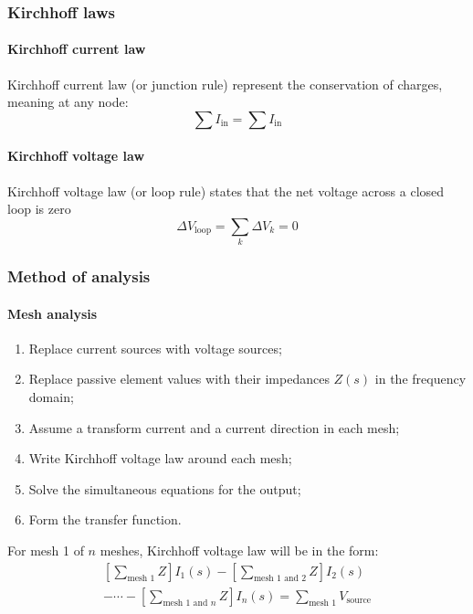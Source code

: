 \documentclass[10pt, twocolumn]{article}
\begin{document}
\subsubsection{Kirchhoff laws}
\paragraph{Kirchhoff current law}
Kirchhoff current law (or junction rule) represent the conservation of charges, meaning at any node:
\[
  \sum{I_\mathrm{in}} = \sum{I_\mathrm{in}}
\]


\paragraph{Kirchhoff voltage law}
Kirchhoff voltage law (or loop rule) states that the net voltage across a closed loop is zero
\[
  \Delta V_{\mathrm{loop}} = \sum_k {\Delta V_k } = 0
\]


\subsubsection{Method of analysis}
\paragraph{Mesh analysis}
\begin{enumerate}
  \item Replace current sources with voltage sources;
  \item Replace passive element values with their impedances \(Z(s)\) in the frequency domain;
  \item Assume a transform current and a current direction in each mesh;
  \item Write Kirchhoff voltage law around each mesh;
  \item Solve the simultaneous equations for the output;
  \item Form the transfer function.
\end{enumerate}

For mesh 1 of \(n\) meshes, Kirchhoff voltage law will be in the form:
\begin{multline*}
  \left[ \sum_\text{mesh 1}{Z} \right] I_1(s) - \left[ \sum_\text{mesh 1 and 2}{Z} \right] I_2(s)\\
  - \cdots - \left[ \sum_{\text{mesh 1 and } n}{Z} \right] I_n(s) = \sum_\text{mesh 1}{V_\text{source}}
\end{multline*}
\end{document}
